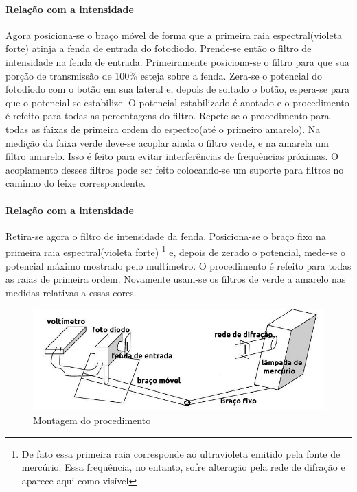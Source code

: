 \documentclass[a4paper,11pt]{article}
\begin{document}
\paragraph{Relação com a intensidade} Agora posiciona-se 
o braço móvel de forma que a primeira raia
espectral(violeta forte) atinja a fenda de entrada do fotodiodo.
Prende-se então o filtro de intensidade na fenda de entrada.
Primeiramente posiciona-se o filtro para que sua porção de
transmissão de 100\% esteja sobre a fenda. Zera-se o
potencial do fotodiodo com o botão em sua lateral e,
depois de soltado o botão, espera-se para que o potencial
se estabilize. O potencial estabilizado é anotado e o
procedimento é refeito para todas as percentagens do filtro.
Repete-se o procedimento para todas as faixas de primeira
ordem do espectro(até o primeiro amarelo). Na medição
da faixa verde deve-se acoplar ainda o filtro verde, e na
amarela um filtro amarelo. Isso é feito para evitar
interferências de frequências próximas. O acoplamento desses
filtros pode ser feito colocando-se um suporte para filtros
no caminho do feixe correspondente.

\paragraph{Relação com a intensidade} Retira-se agora o
filtro de intensidade da fenda. Posiciona-se o braço fixo 
na primeira raia espectral(violeta forte)
\footnote{De fato
essa primeira raia corresponde ao ultravioleta emitido pela
fonte de mercúrio. Essa frequência, no entanto, sofre
alteração pela rede de difração e aparece aqui como visível}
e, depois de zerado o potencial, mede-se o potencial máximo 
mostrado pelo multímetro. O procedimento é refeito para
todas as raias de primeira ordem. Novamente usam-se os
filtros de verde a amarelo nas medidas relativas a essas
cores.

\FloatBarrier
\begin{figure}
  \includegraphics[scale=0.5]{./images/montagem.jpeg}
  \caption{Montagem do procedimento}
  \label{fig:proced}
\end{figure}
\FloatBarrier
\end{document}
